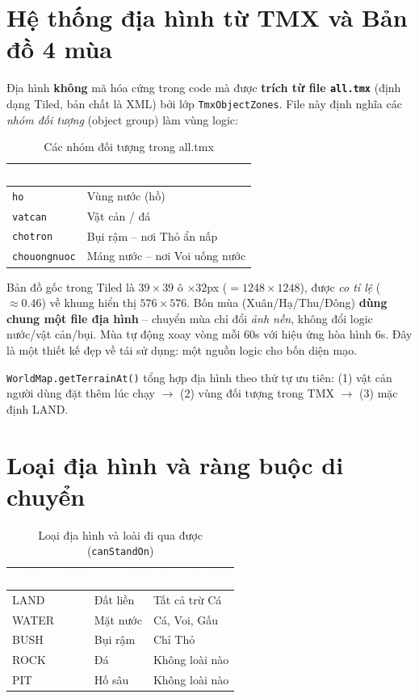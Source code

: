 \documentclass[12pt,a4paper]{report}
\newcommand{\keyword}[1]{\textcolor{primaryblue}{\textbf{#1}}}
\newcommand{\code}[1]{\texttt{\small #1}}
\begin{document}
\section{Hệ thống địa hình từ TMX và Bản đồ 4 mùa}

Địa hình \textbf{không} mã hóa cứng trong code mà được \keyword{trích từ file \code{all.tmx}} (định dạng Tiled, bản chất là XML) bởi lớp \code{TmxObjectZones}. File này định nghĩa các \textit{nhóm đối tượng} (object group) làm vùng logic:

\begin{table}[H]
\centering
\caption{Các nhóm đối tượng trong all.tmx}
\begin{tabular}{L{3.5cm} L{9cm}}
\toprule
{}\textcolor{white}{\textbf{Nhóm}} & \textcolor{white}{\textbf{Ý nghĩa}} \\
\midrule
\code{ho} & Vùng nước (hồ) \\
 \code{vatcan} & Vật cản / đá \\
\code{chotron} & Bụi rậm -- nơi Thỏ ẩn nấp \\
 \code{chouongnuoc} & Máng nước -- nơi Voi uống nước \\
\bottomrule
\end{tabular}
\end{table}

Bản đồ gốc trong Tiled là $39\times39$ ô $\times32$px ($=1248\times1248$), được \textit{co tỉ lệ} ($\approx0.46$) về khung hiển thị $576\times576$. Bốn mùa (Xuân/Hạ/Thu/Đông) \keyword{dùng chung một file địa hình} -- chuyển mùa chỉ đổi \textit{ảnh nền}, không đổi logic nước/vật cản/bụi. Mùa tự động xoay vòng mỗi $60$s với hiệu ứng hòa hình $6$s. Đây là một thiết kế đẹp về tái sử dụng: một nguồn logic cho bốn diện mạo.

\code{WorldMap.getTerrainAt()} tổng hợp địa hình theo thứ tự ưu tiên: (1) vật cản người dùng đặt thêm lúc chạy $\to$ (2) vùng đối tượng trong TMX $\to$ (3) mặc định LAND.

\section{Loại địa hình và ràng buộc di chuyển}

\begin{table}[H]
\centering
\caption{Loại địa hình và loài đi qua được (\code{canStandOn})}
\begin{tabular}{L{2.5cm} L{4cm} L{6cm}}
\toprule
{}
\textcolor{white}{\textbf{TerrainType}} &
\textcolor{white}{\textbf{Mô tả}} &
\textcolor{white}{\textbf{Loài đi được}} \\
\midrule
LAND & Đất liền & Tất cả trừ Cá \\
 WATER & Mặt nước & Cá, Voi, Gấu \\
BUSH & Bụi rậm & Chỉ Thỏ \\
 ROCK & Đá & Không loài nào \\
PIT & Hố sâu & Không loài nào \\
\bottomrule
\end{tabular}
\end{table}
\end{document}
